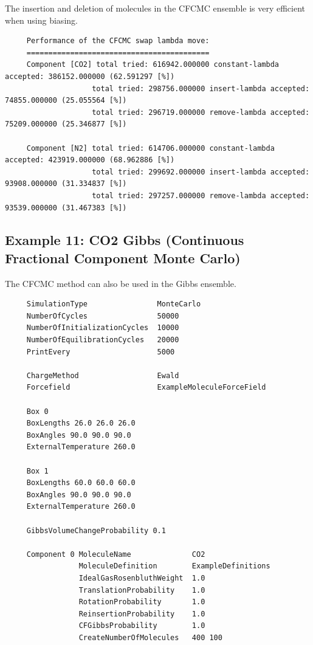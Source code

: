 \indent
The insertion and deletion of molecules in the CFCMC ensemble is very efficient when using biasing.
\begin{tiny}
\begin{verbatim}
     Performance of the CFCMC swap lambda move:
     ==========================================
     Component [CO2] total tried: 616942.000000 constant-lambda accepted: 386152.000000 (62.591297 [%])
                    total tried: 298756.000000 insert-lambda accepted: 74855.000000 (25.055564 [%])
                    total tried: 296719.000000 remove-lambda accepted: 75209.000000 (25.346877 [%])
     
     Component [N2] total tried: 614706.000000 constant-lambda accepted: 423919.000000 (68.962886 [%])
                    total tried: 299692.000000 insert-lambda accepted: 93908.000000 (31.334837 [%])
                    total tried: 297257.000000 remove-lambda accepted: 93539.000000 (31.467383 [%])
\end{verbatim}
\end{tiny}

\subsection*{Example 11: CO2 Gibbs (Continuous Fractional Component Monte Carlo)}

The CFCMC method can also be used in the Gibbs ensemble.
\begin{tiny}
\begin{verbatim}
     SimulationType                MonteCarlo
     NumberOfCycles                50000
     NumberOfInitializationCycles  10000
     NumberOfEquilibrationCycles   20000
     PrintEvery                    5000
     
     ChargeMethod                  Ewald
     Forcefield                    ExampleMoleculeForceField
     
     Box 0
     BoxLengths 26.0 26.0 26.0
     BoxAngles 90.0 90.0 90.0
     ExternalTemperature 260.0
     
     Box 1
     BoxLengths 60.0 60.0 60.0
     BoxAngles 90.0 90.0 90.0
     ExternalTemperature 260.0
     
     GibbsVolumeChangeProbability 0.1
     
     Component 0 MoleculeName              CO2
                 MoleculeDefinition        ExampleDefinitions
                 IdealGasRosenbluthWeight  1.0
                 TranslationProbability    1.0
                 RotationProbability       1.0
                 ReinsertionProbability    1.0
                 CFGibbsProbability        1.0
                 CreateNumberOfMolecules   400 100
\end{verbatim}
\end{tiny}

